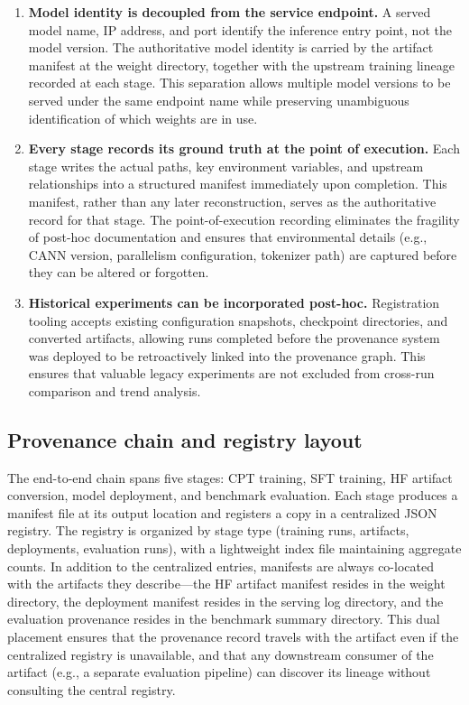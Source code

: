 \begin{enumerate}
  \item \textbf{Model identity is decoupled from the service endpoint.}
  A served model name, IP address, and port identify the inference entry point,
  not the model version. The authoritative model identity is carried by the
  artifact manifest at the weight directory, together with the upstream training
  lineage recorded at each stage. This separation allows multiple model versions
  to be served under the same endpoint name while preserving unambiguous
  identification of which weights are in use.

  \item \textbf{Every stage records its ground truth at the point of execution.}
  Each stage writes the actual paths, key environment variables, and upstream
  relationships into a structured manifest immediately upon completion. This
  manifest, rather than any later reconstruction, serves as the authoritative
  record for that stage. The point-of-execution recording eliminates the
  fragility of post-hoc documentation and ensures that environmental details
  (e.g., CANN version, parallelism configuration, tokenizer path) are captured
  before they can be altered or forgotten.

  \item \textbf{Historical experiments can be incorporated post-hoc.}
  Registration tooling accepts existing configuration snapshots, checkpoint
  directories, and converted artifacts, allowing runs completed before the
  provenance system was deployed to be retroactively linked into the provenance
  graph. This ensures that valuable legacy experiments are not excluded from
  cross-run comparison and trend analysis.
\end{enumerate}

\subsection{Provenance chain and registry layout}

The end-to-end chain spans five stages: CPT training, SFT training, HF artifact
conversion, model deployment, and benchmark evaluation. Each stage produces a
manifest file at its output location and registers a copy in a centralized JSON
registry. The registry is organized by stage type (training runs, artifacts,
deployments, evaluation runs), with a lightweight index file maintaining
aggregate counts. In addition to the centralized entries, manifests are always
co-located with the artifacts they describe---the HF artifact manifest resides
in the weight directory, the deployment manifest resides in the serving log
directory, and the evaluation provenance resides in the benchmark summary
directory. This dual placement ensures that the provenance record travels with
the artifact even if the centralized registry is unavailable, and that any
downstream consumer of the artifact (e.g., a separate evaluation pipeline) can
discover its lineage without consulting the central registry.

